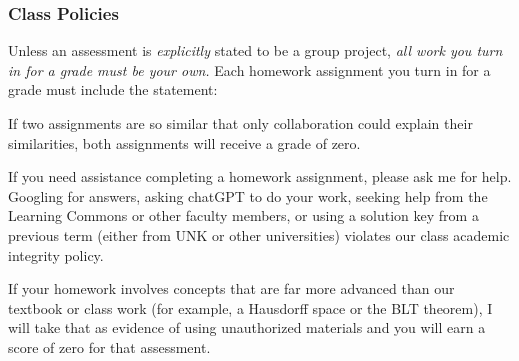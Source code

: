 \documentclass[12pt]{article}
\newcounter{ex}\setcounter{ex}{0}
\begin{document}
\subsubsection* {Class Policies}

Unless an assessment is \emph{explicitly} stated to be a group project,  
\emph{all work you turn in for a grade must be your own.}  Each homework assignment you turn in for a grade must 
include the statement:

\begin{quote}
\end{quote}
 If two assignments are so similar that only collaboration could explain their 
 similarities, both assignments will receive a grade of zero.  

 If  you need assistance completing a homework assignment, please ask 
 me for help. Googling for answers, asking chatGPT to do your work, seeking help 
from the Learning Commons or other faculty members, or using a solution 
key from a previous term (either from UNK or other universities) 
violates our class academic integrity policy.

If your homework involves concepts that are far more advanced than
our textbook or class work (for example, a Hausdorff space or the 
BLT theorem), I will take that as evidence of using unauthorized 
materials and you will earn a score of zero for that assessment.
\end{document}
